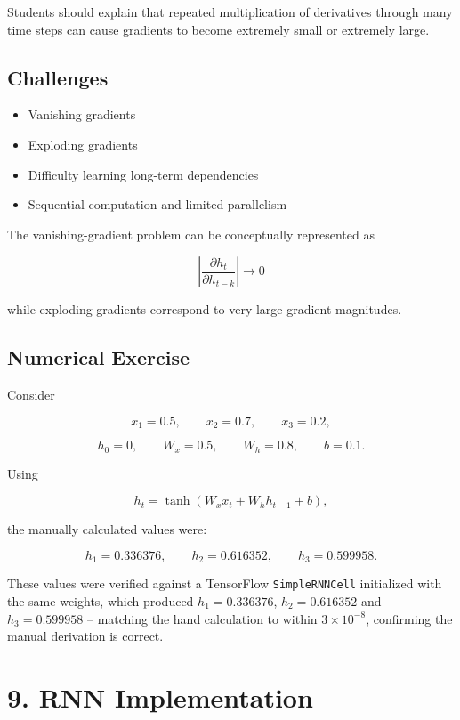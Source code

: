 \documentclass[10pt]{article}
\begin{document}
Students should explain that repeated multiplication of derivatives through
many time steps can cause gradients to become extremely small or extremely
large.

\subsection*{Challenges}

\begin{itemize}
\item Vanishing gradients
\item Exploding gradients
\item Difficulty learning long-term dependencies
\item Sequential computation and limited parallelism
\end{itemize}

The vanishing-gradient problem can be conceptually represented as

\[
\left|\frac{\partial h_t}{\partial h_{t-k}}\right|\rightarrow0
\]

while exploding gradients correspond to very large gradient magnitudes.

\subsection*{Numerical Exercise}

Consider

\[
x_1=0.5,\qquad x_2=0.7,\qquad x_3=0.2,
\]

\[
h_0=0,\qquad W_x=0.5,\qquad W_h=0.8,\qquad b=0.1.
\]

Using

\[
h_t=\tanh(W_xx_t+W_hh_{t-1}+b),
\]

the manually calculated values were:

\[
h_1 = 0.336376,\qquad h_2 = 0.616352,\qquad h_3 = 0.599958.
\]

These values were verified against a TensorFlow \texttt{SimpleRNNCell}
initialized with the same weights, which produced $h_1 = 0.336376$,
$h_2 = 0.616352$ and $h_3 = 0.599958$ -- matching the hand calculation to
within $3\times10^{-8}$, confirming the manual derivation is correct.

\section*{9. RNN Implementation}
\end{document}
